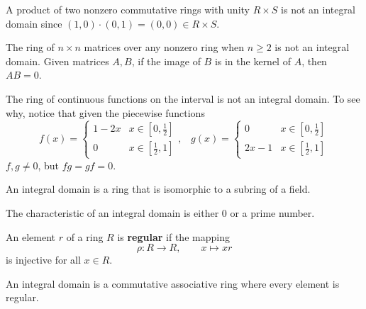   \begin{example}
    A product of two nonzero commutative rings with unity $R \times S$ is not an integral domain since $(1,0) \cdot (0, 1) = (0, 0) \in R \times S$. 
  \end{example}

  \begin{example}
    The ring of $n \times n$ matrices over any nonzero ring when $ n \geq 2$ is not an integral domain. Given matrices $A, B$, if the image of $B$ is in the kernel of $A$, then $A B = 0$.
  \end{example}

  \begin{example}
    The ring of continuous functions on the interval is not an integral domain. To see why, notice that given the piecewise functions 
    \begin{equation}
      f (x) = \begin{cases}
      1 - 2x & x \in [0, \frac{1}{2}] \\
      0 & x \in [\frac{1}{2}, 1] 
      \end{cases}, \; \;\;g (x) = \begin{cases}
      0 & x \in [0, \frac{1}{2}] \\
      2x - 1 & x \in [\frac{1}{2}, 1] 
      \end{cases}
    \end{equation}
    $f, g \neq 0$, but $f g = g f = 0$. 
  \end{example}

  \begin{theorem}
    An integral domain is a ring that is isomorphic to a subring of a field. 
  \end{theorem}

  \begin{theorem}
    The characteristic of an integral domain is either $0$ or a prime number. 
  \end{theorem}

  \begin{definition}
     An element $r$ of a ring $R$ is \textbf{regular} if the mapping 
     \begin{equation}
       \rho: R \longrightarrow R, \qquad x \mapsto x r
     \end{equation}
    is injective for all $x \in R$. 
  \end{definition}

  \begin{theorem}
    An integral domain is a commutative associative ring where every element is regular. 
  \end{theorem} 

